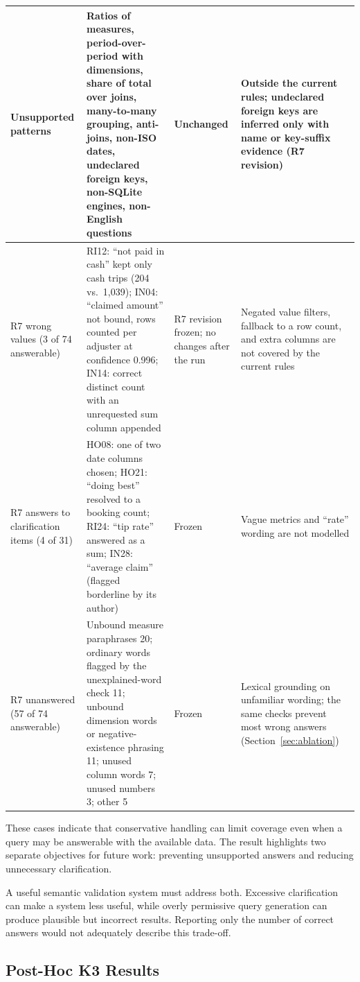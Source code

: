 \documentclass[conference]{IEEEtran}
\begin{document}
\begin{table}[!t]
\begin{tabular}{@{}>{\raggedright}p{}>{\raggedright}p{}>{\raggedright}p{}>{\raggedright\arraybackslash}p{}@{}}
Unsupported patterns & Ratios of measures, period-over-period with dimensions, share of total over joins, many-to-many grouping, anti-joins, non-ISO dates, undeclared foreign keys, non-SQLite engines, non-English questions & Unchanged & Outside the current rules; undeclared foreign keys are inferred only with name or key-suffix evidence (R7 revision) \\
\midrule
R7 wrong values (3 of 74 answerable) & RI12: ``not paid in cash'' kept only cash trips (204 vs.\ 1,039); IN04: ``claimed amount'' not bound, rows counted per adjuster at confidence 0.996; IN14: correct distinct count with an unrequested sum column appended & R7 revision frozen; no changes after the run & Negated value filters, fallback to a row count, and extra columns are not covered by the current rules \\
R7 answers to clarification items (4 of 31) & HO08: one of two date columns chosen; HO21: ``doing best'' resolved to a booking count; RI24: ``tip rate'' answered as a sum; IN28: ``average claim'' (flagged borderline by its author) & Frozen & Vague metrics and ``rate'' wording are not modelled \\
R7 unanswered (57 of 74 answerable) & Unbound measure paraphrases 20; ordinary words flagged by the unexplained-word check 11; unbound dimension words or negative-existence phrasing 11; unused column words 7; unused numbers 3; other 5 & Frozen & Lexical grounding on unfamiliar wording; the same checks prevent most wrong answers (Section~\ref{sec:ablation}) \\
\bottomrule
\end{tabular}
\end{table}

These cases indicate that conservative handling can limit coverage even when a query may be answerable with the available data. The result highlights two separate objectives for future work: preventing unsupported answers and reducing unnecessary clarification.

A useful semantic validation system must address both. Excessive clarification can make a system less useful, while overly permissive query generation can produce plausible but incorrect results. Reporting only the number of correct answers would not adequately describe this trade-off.

\subsection{Post-Hoc K3 Results}
\end{document}
